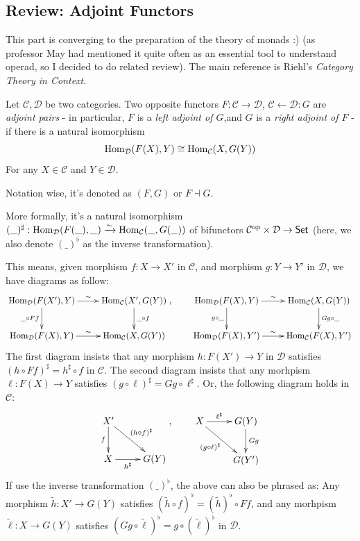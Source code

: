 \documentclass{article}
\begin{document}
\subsection{Review: Adjoint Functors}

This part is converging to the preparation of the theory of monads :) (as professor May had mentioned it quite often as an essential tool to understand operad, so I decided to do related review). The main reference is Riehl's \emph{Category Theory in Context}.

\begin{defn}
    Let $\mathcal{C},\mathcal{D}$ be two categories. Two opposite functors $F:\mathcal{C}\rightarrow \mathcal{D}$, $\mathcal{C}\leftarrow \mathcal{D}:G$ are \emph{adjoint pairs} - in particular, $F$ is a \emph{left adjoint of $G$},and $G$ is a \emph{right adjoint of $F$} - if there is a natural isomorphism
    \[\mathrm{Hom}_\mathcal{D}(F(X),Y)\cong \mathrm{Hom}_\mathcal{C}(X,G(Y))\]
    For any $X\in\mathcal{C}$ and $Y\in\mathcal{D}$.

    Notation wise, it's denoted as $(F,G)$ or $F\dashv G$.
\end{defn}

More formally, it's a natural isomorphism $(\_)^\sharp:\mathrm{Hom}_\mathcal{D}(F(\_),\_)\xrightarrow{\sim}\mathrm{Hom}_\mathcal{C}(\_,G(\_))$ of bifunctors $\mathcal{C}^{\mathrm{op}}\times\mathcal{D}\rightarrow\mathsf{Set}$ (here, we also denote $(\_)^\flat$ as the inverse transformation). 

This means, given morphism $f:X\rightarrow X'$ in $\mathcal{C}$, and morphism $g:Y\rightarrow Y'$ in $\mathcal{D}$, we have diagrams as follow:
\[\xymatrix{
    \Hom_\mathcal{D}(F(X'),Y) \ar[d]_-{\_\circ Ff}\ar[r]^-{\sim} & \Hom_\mathcal{C}(X',G(Y)) \ar[d]^-{\_\circ f}\\
    \Hom_\mathcal{D}(F(X),Y)\ar[r]^-{\sim} & \Hom_\mathcal{C}(X,G(Y))
},\quad \quad \xymatrix{
    \Hom_\mathcal{D}(F(X),Y) \ar[d]_-{g\circ \_} \ar[r]^-{\sim} & \Hom_\mathcal{C}(X,G(Y)) \ar[d]^-{Gg\circ \_}\\
    \Hom_\mathcal{D}(F(X),Y')\ar[r]^-{\sim} & \Hom_\mathcal{C}(F(X),Y')
}\]
The first diagram insists that any morphism $h:F(X')\rightarrow Y$ in $\mathcal{D}$ satisfies $(h\circ Ff)^\sharp = h^\sharp \circ f$ in $\mathcal{C}$. The second diagram insists that any morhpism $\ell:F(X)\rightarrow Y$ satisfies $(g\circ \ell)^\sharp = Gg\circ \ell^\sharp$. Or, the following diagram holds in $\mathcal{C}$:
\[\xymatrix{
    X' \ar[d]_-{f} \ar[dr]^-{(h\circ f)^\sharp}\\
    X \ar[r]_-{h^\sharp} & G(Y)
},\quad\quad \xymatrix{
    X \ar[r]^-{\ell^\sharp} \ar[dr]_-{(g\circ \ell)^\sharp} & G(Y) \ar[d]^-{Gg}\\
    & G(Y')
}\]
If use the inverse transformation $(\_)^\flat$, the above can also be phrased as: Any morphism $\tilde{h}:X'\rightarrow G(Y)$ satisfies $(\tilde{h}\circ f)^\flat = (\tilde{h})^\flat \circ Ff$, and any morhpism $\tilde{\ell}:X\rightarrow G(Y)$ satisfies $(Gg\circ \tilde{\ell})^\flat = g\circ (\tilde{\ell})^\flat$ in $\mathcal{D}$.
\end{document}

